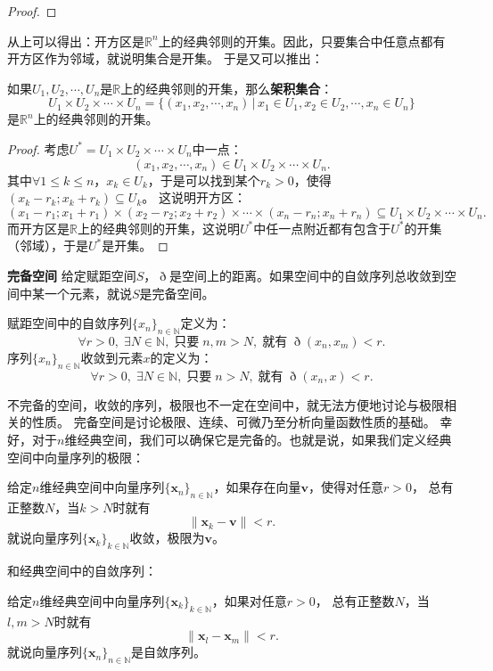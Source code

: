 \documentclass[12pt,UTF8]{ctexbook}
\begin{document}
\begin{appendix}
\begin{proof}
\end{proof}

从上可以得出：开方区是$\mathbb{R}^n$上的经典邻则的开集。因此，只要集合中任意点都有开方区作为邻域，就说明集合是开集。
于是又可以推出：

\begin{tm}\label{tm:b-1-20}
    如果$U_1,U_2,\cdots, U_n$是$\mathbb{R}$上的经典邻则的开集，那么\textbf{架积集合}：
    $$ U_1\times U_2\times \cdots \times U_n = \{(x_1, x_2, \cdots, x_n) \, | \, x_1\in U_1, x_2\in U_2, \cdots , x_n\in U_n\} $$
    是$\mathbb{R}^n$上的经典邻则的开集。
\end{tm}

\begin{proof}
    考虑$U^* = U_1\times U_2\times \cdots \times U_n$中一点：
    $$ (x_1, x_2, \cdots, x_n) \in U_1\times U_2\times \cdots \times U_n. $$
    其中$\forall 1\leqslant k\leqslant n$，$x_k\in U_k$，于是可以找到某个$r_k>0$，使得$(x_k-r_k;x_k+r_k)\subseteq U_k$。
    这说明开方区：
    $$ (x_1-r_1;x_1+r_1)\times(x_2-r_2;x_2+r_2)\times\cdots\times(x_n-r_n;x_n+r_n) \subseteq U_1\times U_2\times \cdots \times U_n. $$
    而开方区是$\mathbb{R}$上的经典邻则的开集，这说明$U^*$中任一点附近都有包含于$U^*$的开集（邻域），于是$U^*$是开集。

\end{proof}

\begin{df}{\textbf{完备空间}}
    给定赋距空间$S$，$\eth$是空间上的距离。如果空间中的自敛序列总收敛到空间中某一个元素，就说$S$是完备空间。

    赋距空间中的自敛序列$\{x_n\}_{n\in\mathbb{N}}$定义为：
    $$ \forall r > 0, \; \exists N\in\mathbb{N}, \; \mbox{只要}\;n,m> N, \;\mbox{就有}\; \eth(x_n, x_m) < r.$$
    序列$\{x_n\}_{n\in\mathbb{N}}$收敛到元素$x$的定义为：
    $$ \forall r > 0, \; \exists N\in\mathbb{N}, \; \mbox{只要}\;n> N, \;\mbox{就有}\; \eth(x_n, x) < r.$$
\end{df}

不完备的空间，收敛的序列，极限也不一定在空间中，就无法方便地讨论与极限相关的性质。
完备空间是讨论极限、连续、可微乃至分析向量函数性质的基础。
幸好，对于$n$维经典空间，我们可以确保它是完备的。也就是说，如果我们定义经典空间中向量序列的极限：
\begin{df}
    给定$n$维经典空间中向量序列$\{\mathbf{x}_n\}_{n\in\mathbb{N}}$，如果存在向量$\mathbf{v}$，使得对任意$r>0$，
    总有正整数$N$，当$k>N$时就有
    $$ \| \mathbf{x}_k - \mathbf{v}\| < r. $$
    就说向量序列$\{\mathbf{x}_k\}_{k\in\mathbb{N}}$收敛，极限为$\mathbf{v}$。
\end{df}
和经典空间中的自敛序列：
\begin{df}
    给定$n$维经典空间中向量序列$\{\mathbf{x}_k\}_{k\in\mathbb{N}}$，如果对任意$r>0$，
    总有正整数$N$，当$l, m>N$时就有
    $$ \| \mathbf{x}_l - \mathbf{x}_m\| < r. $$
    就说向量序列$\{\mathbf{x}_n\}_{n\in\mathbb{N}}$是自敛序列。
\end{df}


\end{appendix}
\end{document}

